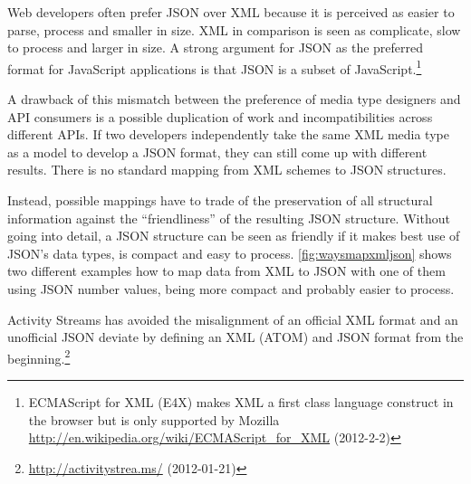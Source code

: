 \documentclass[12pt,a4paper]{scrartcl}		%
\newcommand{\citeurl}[2]{\url{#1} (#2)}
\begin{document}
Web developers often prefer JSON over XML because it is perceived as easier to
parse, process and smaller in size. XML in comparison is seen as complicate,
slow to process and larger in size. A strong argument for JSON as the preferred
format for JavaScript applications is that JSON is a subset of
JavaScript.\footnote{ECMAScript for XML (E4X) makes XML a first class language
  construct in the browser but is only supported by Mozilla
  \citeurl{http://en.wikipedia.org/wiki/ECMAScript_for_XML}{2012-2-2}}

A drawback of this mismatch between the preference of media type designers and
API consumers is a possible duplication of work and incompatibilities across
different APIs. If two developers independently take the same XML media type as
a model to develop a JSON format, they can still come up with different
results. There is no standard mapping from XML schemes to JSON structures.

Instead, possible mappings have to trade of the preservation of all structural
information against the ``friendliness'' of the resulting JSON
structure.\cite{Boyer2011} Without going into detail, a JSON structure can be
seen as friendly if it makes best use of JSON's data types, is compact and easy
to process. \autoref{fig:waysmapxmljson} shows two different examples how to map
data from XML to JSON with one of them using JSON number values, being more
compact and probably easier to process.

%        
%    
%    

Activity Streams has avoided the misalignment of an official XML format and an unofficial JSON deviate by defining an XML (ATOM) and JSON format from the beginning.\footnote{\citeurl{http://activitystrea.ms/}{2012-01-21}}
\end{document}
